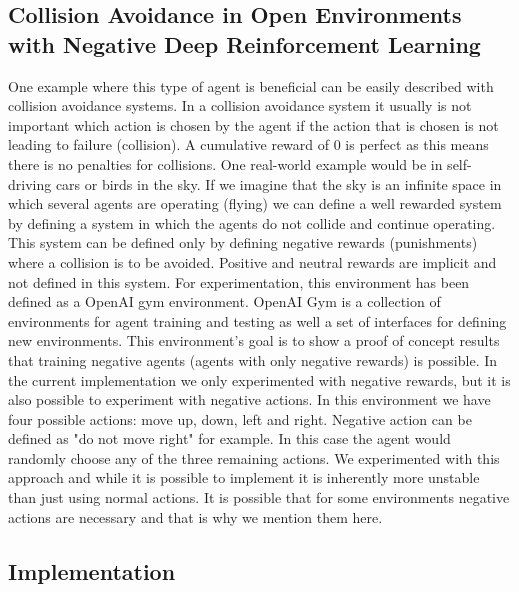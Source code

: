 \documentclass[b5paper]{book}
\begin{document}
\subsection{Collision Avoidance in Open Environments with Negative Deep Reinforcement Learning}

One example where this type of agent is beneficial can be easily described with collision avoidance systems. In a collision avoidance system it usually is not important which action is chosen by the agent if the action that is chosen is not leading to failure (collision). A cumulative reward of 0 is perfect as this means there is no penalties for collisions. One real-world example would be in self-driving cars or birds in the sky. If we imagine that the sky is an infinite space in which several agents are operating (flying) we can define a well rewarded system by defining a system in which the agents do not collide and continue operating. This system can be defined only by defining negative rewards (punishments) where a collision is to be avoided. Positive and neutral rewards are implicit and not defined in this system. For experimentation, this environment has been defined as a OpenAI gym environment. OpenAI Gym is a collection of environments for agent training and testing as well a set of interfaces for defining new environments. This environment's goal is to show a proof of concept results that training negative agents (agents with only negative rewards) is possible. In the current implementation we only experimented with negative rewards, but it is also possible to experiment with negative actions. In this environment we have four possible actions: move up, down, left and right. Negative action can be defined as "do not move right" for example. In this case the agent would randomly choose any of the three remaining actions. We experimented with this approach and while it is possible to implement it is inherently more unstable than just using normal actions. It is possible that for some environments negative actions are necessary and that is why we mention them here.

\subsection{Implementation}
\end{document}
